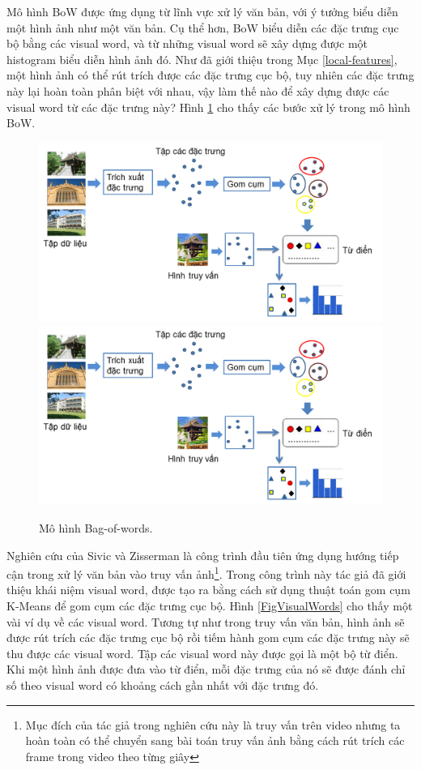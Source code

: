 Mô hình BoW được ứng dụng từ lĩnh vực xử lý văn bản, với ý tưởng biểu diễn một hình ảnh như một văn bản. Cụ thể hơn, BoW biểu diễn các đặc trưng cục bộ bằng các visual word, và từ những visual word sẽ xây dựng được một histogram biểu diễn hình ảnh đó. Như đã giới thiệu trong Mục \ref{local-features}, một hình ảnh có thể rút trích được các đặc trưng cục bộ, tuy nhiên các đặc trưng này lại hoàn toàn phân biệt với nhau, vậy làm thế nào để xây dựng được các visual word từ các đặc trưng này? Hình \ref{FigBoW} cho thấy các bước xử lý trong mô hình BoW.

\begin{figure}[!htbp]
  \begin{center}
    \leavevmode
    \ifpdf
      \includegraphics[scale=0.38]{bow}
    \else
      \includegraphics[scale=0.38]{bow}
    \fi
    \caption[Mô hình Bag-of-words]{Mô hình Bag-of-words.}
    \label{FigBoW}
  \end{center}
\end{figure}

Nghiên cứu của Sivic và Zisserman \cite{sivic2003video} là công trình đầu tiên ứng dụng hướng tiếp cận trong xử lý văn bản vào truy vấn ảnh\footnote{Mục đích của tác giả trong nghiên cứu này là truy vấn trên video nhưng ta hoàn toàn có thể chuyển sang bài toán truy vấn ảnh bằng cách rút trích các frame trong video theo từng giây}. Trong công trình này tác giả đã giới thiệu khái niệm visual word, được tạo ra bằng cách sử dụng thuật toán gom cụm K-Means để gom cụm các đặc trưng cục bộ. Hình \ref{FigVisualWords} cho thấy một vài ví dụ về các visual word. Tương tự như trong truy vấn văn bản, hình ảnh sẽ được rút trích các đặc trưng cục bộ rồi tiếm hành gom cụm các đặc trưng này sẽ thu được các visual word. Tập các visual word này được gọi là một bộ từ điển. Khi một hình ảnh được đưa vào từ điển, mỗi đặc trưng của nó sẽ được đánh chỉ số theo visual word có khoảng cách gần nhất với đặc trưng đó.

